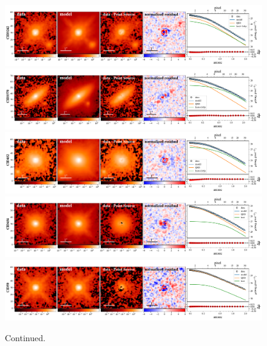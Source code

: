 \documentclass[apj]{emulateapj}
\begin{document}
\begin{figure}
\centering
{
\includegraphics[height=0.25\textwidth]{fig/best_fit_CID3242_SB_profile.pdf}
\includegraphics[height=0.25\textwidth]{fig/best_fit_CID3570_SB_profile.pdf}
\includegraphics[height=0.25\textwidth]{fig/best_fit_CID452_SB_profile.pdf}
\includegraphics[height=0.25\textwidth]{fig/best_fit_CID454_SB_profile.pdf}
\includegraphics[height=0.25\textwidth]{fig/best_fit_CID50_SB_profile.pdf}
}
\caption{Continued.}
\end{figure} 
\end{document}
